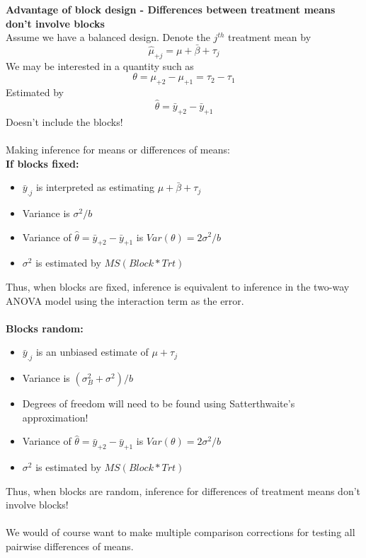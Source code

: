 \newpage

\textbf{Advantage of block design - Differences between treatment means don't involve blocks}\\
Assume we have a balanced design.  Denote the $j^{th}$ treatment mean by 
$$\hat{\mu}_{+j}=\mu+\bar{\beta}+\tau_{j}$$
We may be interested in a quantity such as 
$$\theta =\mu_{+2}-\mu_{+1}=\tau_{2}-\tau_{1}$$
Estimated by 
$$\hat{\theta} = \bar{y}_{+2}-\bar{y}_{+1}$$
Doesn't include the blocks!\\~\\

Making inference for means or differences of means:	\\	
\textbf{If blocks fixed:}
			\begin{itemize}
				\item{$\bar{y}_{.j}$ is interpreted as estimating $\mu+\bar{\beta}+\tau_{j}$}
				\item{Variance is $\sigma^{2}/b$}
				\item{Variance of $\hat{\theta}= \bar{y}_{+2}-\bar{y}_{+1}$ is $Var(\theta)=2\sigma^{2}/b$}
				\item{$\sigma^2$ is estimated by $MS(Block*Trt)$}
			\end{itemize}
Thus, when blocks are fixed, inference is equivalent to inference in the two-way ANOVA model using the interaction term as the error.\\~\\
\textbf{Blocks random:}
			\begin{itemize}
				\item{$\bar{y}_{.j}$ is an unbiased estimate of $\mu+\tau_{j}$}
				\item{Variance is $(\sigma_{B}^2+\sigma^2)/b$}
				\item{Degrees of freedom will need to be found using Satterthwaite's approximation!}
				\item{Variance of $\hat{\theta}= \bar{y}_{+2}-\bar{y}_{+1}$ is $Var(\theta)=2\sigma^{2}/b$}
				\item{$\sigma^2$ is estimated by $MS(Block*Trt)$}
			\end{itemize}
Thus, when blocks are random, inference for differences of treatment means don't involve blocks!\\~\\

We would of course want to make multiple comparison corrections for testing all pairwise differences of means.\\~\\

